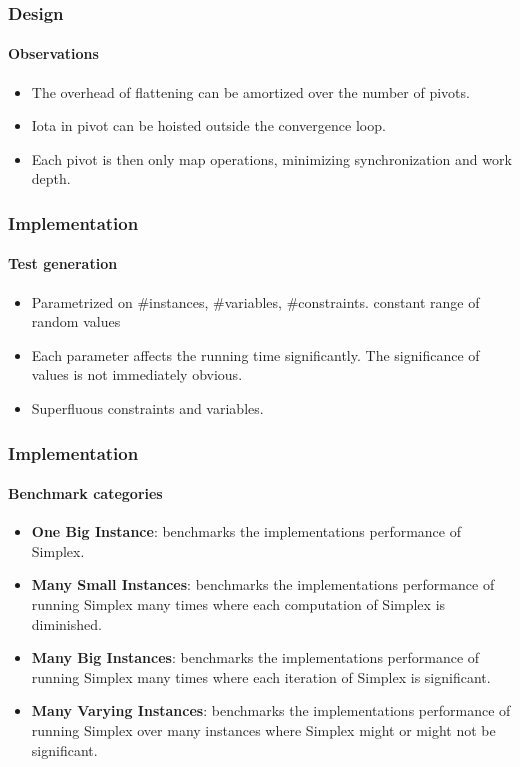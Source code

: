 \documentclass{beamer}
\begin{document}
\begin{frame}
\frametitle{Design}
\framesubtitle{Observations}
\begin{itemize}
	\item The overhead of flattening can be amortized over the number of pivots.
	
	\item Iota in pivot can be hoisted outside the convergence loop.
	
	\item Each pivot is then only map operations, minimizing synchronization and work depth.
\end{itemize}
\end{frame}


\begin{frame}
	\frametitle{Implementation}
	\framesubtitle{Test generation}
	\begin{itemize}
		\item Parametrized on \#instances, \#variables, \#constraints. constant range of random values
		
		\item Each parameter affects the running time significantly. The significance of values is not immediately obvious.
		
		\item Superfluous constraints and variables.
	\end{itemize}
\end{frame}

\begin{frame}
\frametitle{Implementation}
\framesubtitle{Benchmark categories}
\begin{itemize}
	\item \textbf{One Big Instance}: benchmarks the implementations performance of Simplex.
	
	\item \textbf{Many Small Instances}: benchmarks the implementations performance of running Simplex many times where each computation of Simplex is diminished.
	
	\item \textbf{Many Big Instances}: benchmarks the implementations performance of running Simplex many times where each iteration of Simplex is significant.
	
	\item \textbf{Many Varying Instances}: benchmarks the implementations performance of running Simplex over many instances where Simplex might or might not be significant.
\end{itemize}
\end{frame}
\end{document}

